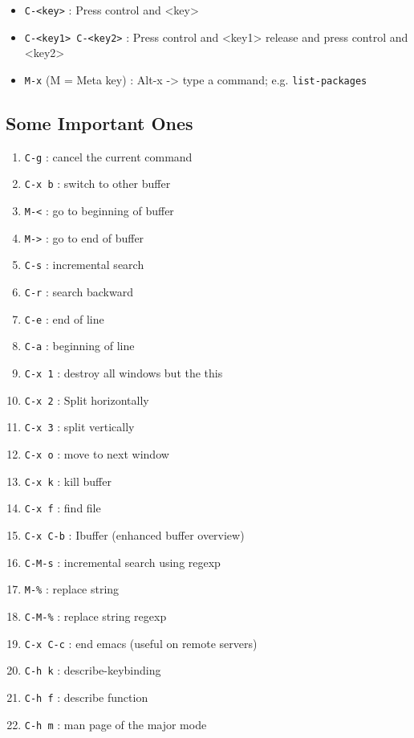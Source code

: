 \documentclass[11pt]{article}
\begin{document}
\begin{itemize}
\item \texttt{C-<key>}            : Press control and <key>

\item \texttt{C-<key1> C-<key2>}  : Press control and <key1> release and 
press control and <key2>

\item \texttt{M-x} (M = Meta key) : Alt-x -> type a command; e.g. \texttt{list-packages}
\end{itemize}
\subsection{Some Important Ones}
\label{sec:org9a59151}

\begin{enumerate}
\item \texttt{C-g}        : cancel the current command
\item \texttt{C-x b}      : switch to other buffer
\item \texttt{M-<}        : go to beginning of buffer
\item \texttt{M->}        : go to end of buffer
\item \texttt{C-s}        : incremental search
\item \texttt{C-r}        : search backward
\item \texttt{C-e}        : end of line
\item \texttt{C-a}        : beginning of line
\item \texttt{C-x 1}      : destroy all windows but the this
\item \texttt{C-x 2}     : Split horizontally
\item \texttt{C-x 3}     : split vertically
\item \texttt{C-x o}     : move to next window
\item \texttt{C-x k}     : kill buffer
\item \texttt{C-x f}     : find file
\item \texttt{C-x C-b}   : Ibuffer (enhanced buffer overview)
\item \texttt{C-M-s}     : incremental search using regexp
\item \texttt{M-\%}       : replace string
\item \texttt{C-M-\%}     : replace string regexp
\item \texttt{C-x C-c}   : end emacs (useful on remote servers)
\item \texttt{C-h k}     : describe-keybinding
\item \texttt{C-h f}     : describe function
\item \texttt{C-h m}     : man page of the major mode


\end{enumerate}
\end{document}
